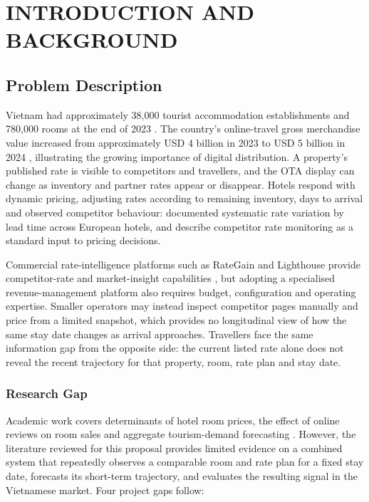 \chapter{INTRODUCTION AND BACKGROUND}

\section{Problem Description}

Vietnam had approximately 38,000 tourist accommodation establishments and 780,000 rooms at the end of 2023 \citep{vnat2024}. The country's online-travel gross merchandise value increased from approximately USD 4 billion in 2023 to USD 5 billion in 2024 \citep{googletemasek2024}, illustrating the growing importance of digital distribution. A property's published rate is visible to competitors and travellers, and the OTA display can change as inventory and partner rates appear or disappear. Hotels respond with dynamic pricing, adjusting rates according to remaining inventory, days to arrival and observed competitor behaviour: \citet{abrate2012} documented systematic rate variation by lead time across European hotels, and \citet{ivanov2014} describe competitor rate monitoring as a standard input to pricing decisions.

Commercial rate-intelligence platforms such as RateGain and Lighthouse provide competitor-rate and market-insight capabilities \citep{lighthouse2025, rategain2025}, but adopting a specialised revenue-management platform also requires budget, configuration and operating expertise. Smaller operators may instead inspect competitor pages manually and price from a limited snapshot, which provides no longitudinal view of how the same stay date changes as arrival approaches. Travellers face the same information gap from the opposite side: the current listed rate alone does not reveal the recent trajectory for that property, room, rate plan and stay date.

\subsection{Research Gap}

Academic work covers determinants of hotel room prices, the effect of online reviews on room sales and aggregate tourism-demand forecasting \citep{ye2009, zhang2011, law2019}. However, the literature reviewed for this proposal provides limited evidence on a combined system that repeatedly observes a comparable room and rate plan for a fixed stay date, forecasts its short-term trajectory, and evaluates the resulting signal in the Vietnamese market. Four project gaps follow:

